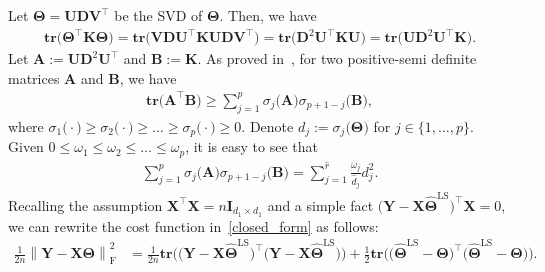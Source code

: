 \documentclass[alpha-refs]{wiley-article}
\begin{document}
Let $\boldsymbol{\Theta}=\boldsymbol{U}\boldsymbol{D}\boldsymbol{V}^{\top}$ be the SVD of $\boldsymbol{\Theta}$.
Then, we have
\begin{align*}
    \textbf{tr}\big(\boldsymbol{\Theta}^{\top}\boldsymbol{K}\boldsymbol{\Theta}\big)
    =\textbf{tr}\big(\boldsymbol{V}\boldsymbol{D}\boldsymbol{U}^{\top}\boldsymbol{K}\boldsymbol{U}\boldsymbol{D}\boldsymbol{V}^{\top}\big)
    =\textbf{tr}\big(\boldsymbol{D}^{2}\boldsymbol{U}^{\top}\boldsymbol{K}\boldsymbol{U}\big)
    =\textbf{tr}\big(\boldsymbol{U}\boldsymbol{D}^{2}\boldsymbol{U}^{\top}\boldsymbol{K}\big).
\end{align*}
Let $\boldsymbol{A}:=\boldsymbol{U}\boldsymbol{D}^{2}\boldsymbol{U}^{\top}$ and $\boldsymbol{B}:=\boldsymbol{K}$.
As proved in~\cite{ruhe1970perturbation}, for two positive-semi definite matrices $\boldsymbol{A}$ and $\boldsymbol{B}$, we have
\begin{align} \label{Upper_bnd}
    \textbf{tr}\big(\boldsymbol{A}^{\top}\boldsymbol{B}\big)\geq \sum_{j=1}^{p}\sigma_{j}\big(\boldsymbol{A}\big)\sigma_{p+1-j}\big(\boldsymbol{B}\big),
\end{align}
where $\sigma_{1}\big(\cdot\big)\geq\sigma_{2}\big(\cdot\big)\geq\dots\geq\sigma_{p}\big(\cdot\big)\geq0$.
Denote $d_{j}:=\sigma_{j}\big(\boldsymbol{\Theta}\big)$ for $j\in\{1,\dots,p\}$.
Given $0\leq \omega_{1} \leq \omega_{2} \leq \dots \leq \omega_{p}$, it is easy to see that
\begin{align} \label{Lower_bnd}
    \sum_{j=1}^{p}\sigma_{j}\big(\boldsymbol{A}\big)\sigma_{p+1-j}\big(\boldsymbol{B}\big)
    = \sum_{j=1}^{\widehat{r}} \frac{\omega_{j}}{\widehat{d}_{j}}d_{j}^2.
\end{align}
Recalling the assumption $\boldsymbol{X}^{\top}\boldsymbol{X}=n\boldsymbol{I}_{d_{1} \times d_{1}}$ and a simple fact $\big(\boldsymbol{Y}-\boldsymbol{X}\widehat{\boldsymbol{\Theta}}^{\text{LS}}\big)^{\top}\boldsymbol{X}=0$, we can rewrite the cost function in~\eqref{closed_form} as follows:
\begin{align} \label{cost}
    \frac{1}{2n} \left\| \boldsymbol{Y}-\boldsymbol{X}\boldsymbol{\Theta} \right\|_{\text{F}}^{2}
    &= \frac{1}{2n} \textbf{tr}\big( \big(\boldsymbol{Y}-\boldsymbol{X}\widehat{\boldsymbol{\Theta}}^{\text{LS}}\big)^{\top} \big( \boldsymbol{Y}-\boldsymbol{X}\widehat{\boldsymbol{\Theta}}^{\text{LS}}\big) \big)
    + \frac{1}{2} \textbf{tr}\big( \big(\widehat{\boldsymbol{\Theta}}^{\text{LS}}-\boldsymbol{\Theta}\big)^{\top} \big(\widehat{\boldsymbol{\Theta}}^{\text{LS}}-\boldsymbol{\Theta}\big) \big).
\end{align}
\end{document}
